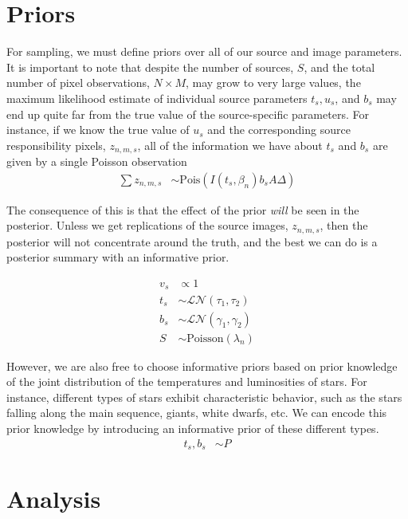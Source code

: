 \documentclass[11pt]{article}
\begin{document}
\section{Priors}

For sampling, we must define priors over all of our source and image parameters.  It is important to note that despite the number of sources, $S$, and the total number of pixel observations, $N \times M$, may grow to very large values, the maximum likelihood estimate of individual source parameters $t_s, u_s$, and $b_s$ may end up quite far from the true value of the source-specific parameters.  For instance, if we know the true value of $u_s$ and the corresponding source responsibility pixels, $z_{n,m,s}$, all of the information we have about $t_s$ and $b_s$ are given by a single Poisson observation 
\begin{align}
  \sum z_{n,m,s} &\sim \textrm{Pois}\left( I(t_s, \beta_n) b_s A \Delta \right) 
\end{align}

The consequence of this is that the effect of the prior \emph{will} be seen in the posterior.  Unless we get replications of the source images, $z_{n,m,s}$, then the posterior will not concentrate around the truth, and the best we can do is a posterior summary with an informative prior.  

\begin{align}
  v_s &\propto 1 \\
  t_s &\sim \mathcal{LN}(\tau_1, \tau_2) \\
  b_s &\sim \mathcal{LN}(\gamma_1, \gamma_2) \\
  S   &\sim \textrm{Poisson}(\lambda_n) 
\end{align}


However, we are also free to choose informative priors based on prior knowledge of the joint distribution of the temperatures and luminosities of stars.  For instance, different types of stars exhibit characteristic behavior, such as the stars falling along the main sequence, giants, white dwarfs, etc.  We can encode this prior knowledge by introducing an informative prior of these different types.  
\begin{align}
  t_s, b_s &\sim P
\end{align}


\section{Analysis}
\end{document}
